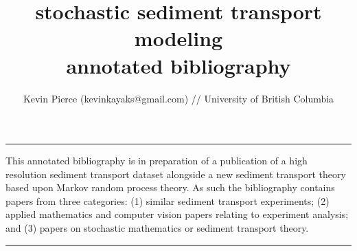 \documentclass [11pt]{article}
\title{\textbf{stochastic sediment transport modeling} \\ annotated bibliography}
\author{Kevin Pierce (kevinkayaks@gmail.com) // University of British Columbia}
\date{}
\begin{document}
\maketitle
\vspace{-1cm}
\noindent\rule{\textwidth}{1pt}
\vspace{-0.25cm}

\noindent This annotated bibliography is in preparation of a publication of a high resolution sediment transport dataset alongside a new sediment transport theory based upon Markov random process theory. As such the bibliography contains papers from three categories: (1) similar sediment transport experiments; (2) applied mathematics and computer vision papers relating to experiment analysis; and (3) papers on stochastic mathematics or sediment transport theory.\\  
\noindent\rule{\textwidth}{1pt}

\nocite{*}


\end{document}
